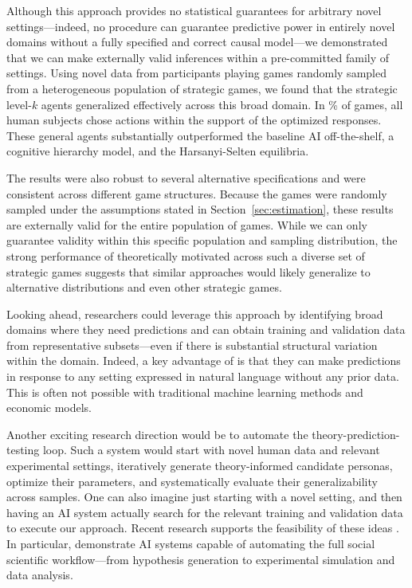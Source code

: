 Although this approach provides no statistical guarantees for arbitrary novel settings---indeed, no procedure can guarantee predictive power in entirely novel domains without a fully specified and correct causal model---we demonstrated that we can make externally valid inferences within a pre-committed family of settings.
Using novel data from \SampleSizeHuman{} participants playing \SampleSizeGame{} games randomly sampled from a heterogeneous population of \TotalGames{} strategic games, we found that the strategic level-$k$ agents generalized effectively across this broad domain.
In \OptGameAllMatchRate\% of games, all human subjects chose actions within the support of the optimized \aisub{} responses. 
These general agents substantially outperformed the baseline AI off-the-shelf, a cognitive hierarchy model, and the Harsanyi-Selten equilibria.

The results were also robust to several alternative specifications and were consistent across different game structures.
Because the games were randomly sampled under the assumptions stated in Section~\ref{sec:estimation}, these results are externally valid for the entire population of \TotalGames{} games.
While we can only guarantee validity within this specific population and sampling distribution, the strong performance of theoretically motivated  across such a diverse set of strategic games suggests that similar approaches would likely generalize to alternative distributions and even other strategic games.

Looking ahead, researchers could leverage this approach by identifying broad domains where they need predictions and can obtain training and validation data from representative subsets---even if there is substantial structural variation within the domain.
Indeed, a key advantage of  is that they can make predictions in response to any setting expressed in natural language without any prior data.
This is often not possible with traditional machine learning methods and economic models.

Another exciting research direction would be to automate the theory-prediction-testing loop.
Such a system would start with novel human data and relevant experimental settings, iteratively generate theory-informed candidate personas, optimize their parameters, and systematically evaluate their generalizability across samples.
One can also imagine just starting with a novel setting, and then having an AI system actually search for the relevant training and validation data to execute our approach.
Recent research supports the feasibility of these ideas \citep{Jackson2025Mixture,zhu2025ExplPredicting}.
In particular, \cite{Manning2024Automated} demonstrate AI systems capable of automating the full social scientific workflow---from hypothesis generation to experimental simulation and data analysis.

